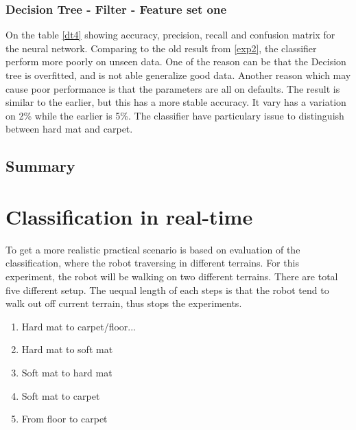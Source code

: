\documentclass[USenglish]{ifimaster}  %
\begin{document}
\subsubsection{Decision Tree - Filter - Feature set one}
On the table \ref{dt4} showing accuracy, precision, recall and confusion matrix for the neural network. Comparing to the old result from \ref{exp2}, the classifier perform more poorly on unseen data. One of the reason can be that the Decision tree is overfitted, and is not able generalize good data. Another reason which may cause poor performance is that the parameters are all on defaults. The result is similar to the earlier, but this has a more stable accuracy. It vary has a variation on 2\% while the earlier is 5\%. The classifier have particulary issue to distinguish between hard mat and carpet. 


\subsection{Summary}

\section{Classification in real-time}
To get a more realistic practical scenario  is based on evaluation of the classification, where the robot traversing in different terrains. For this experiment, the robot will be walking on two different terrains. There are total five different setup. The uequal length of each steps is that the robot tend to walk out off current terrain, thus stops the experiments. 

\begin{enumerate}
\item Hard mat to carpet/floor...
\item Hard mat to soft mat
\item Soft mat to hard mat
\item Soft mat to carpet
\item From floor to carpet
\end{enumerate}
\end{document}
